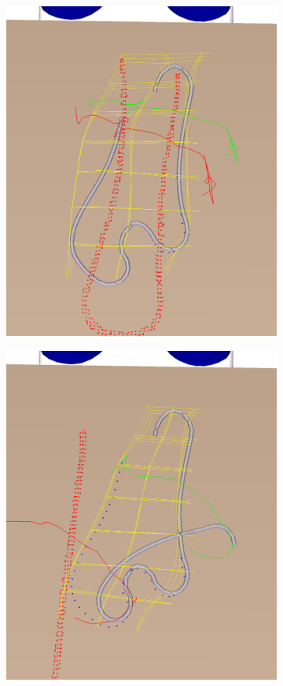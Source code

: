 \documentclass{article}
\begin{document}
\begin{figure}
\begin{subfigure}[b]{.24\textwidth}
\caption{}
\end{subfigure}
\begin{subfigure}[b]{.24\textwidth}
\includegraphics[width=\textwidth]{sim_res2.png}
\caption{}
\end{subfigure}
\begin{subfigure}[b]{.24\textwidth}
\includegraphics[width=\textwidth]{sim_res3.png}

\end{subfigure}
\end{figure}
\end{document}
